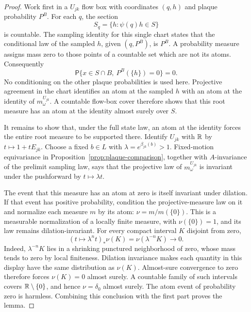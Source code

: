 \begin{proof}
Work first in a $U_{jk}$ flow box with coordinates $(q,h)$ and plaque
probability $P^B$.  For each $q$, the section
\[
                  S_q=\{h:\psi(q)h\in S\}
\]
is countable.  The sampling identity for this single chart states
that the conditional law of the sampled $h$, given $(q,P^B)$, is
$P^B$.  A probability measure assigns mass zero to those points of a
countable set which are not its atoms.  Consequently
\[
 \mathsf P\{x\in S\cap B,\ P^B(\{h\})=0\}=0.
\]
No conditioning on the other plaque probabilities is used here.
Projective agreement in the chart identifies an atom at the sampled
$h$ with an atom at the identity of $m^{U_{jk}}_\omega$.  A countable
flow-box cover therefore shows that this root measure has an atom at
the identity almost surely over $S$.

It remains to show that, under the full state law, an atom at the
identity forces the entire root measure to be supported there.
Identify $U_{jk}$ with $\mathbb R$ by $t\mapsto1+tE_{jk}$.  Choose a fixed
$b\in L$ with $\lambda=e^{\beta_{jk}(b)}>1$.  Fixed-motion equivariance
in Proposition~\ref{prop:plaque-comparison}, together with
$A$-invariance of the prelimit sampling law, says that the projective
law of $m^{U_{jk}}_\omega$ is invariant under the pushforward by
$t\mapsto\lambda t$.

The event that this measure has an atom at zero is itself invariant
under dilation.  If that event has positive probability, condition
the projective-measure law on it and normalize each measure $m$ by
its atom: $\nu=m/m(\{0\})$.  This is a measurable normalization of a
locally finite measure, with $\nu(\{0\})=1$, and its law remains
dilation-invariant.  For every compact interval $K$ disjoint from
zero,
\[
 (t\mapsto\lambda^n t)_*\nu(K)
         =\nu(\lambda^{-n}K)\longrightarrow0.
\]
Indeed, $\lambda^{-n}K$ lies in a shrinking punctured neighborhood of
zero, whose mass tends to zero by local finiteness.  Dilation
invariance makes each quantity in this display have the same
distribution as $\nu(K)$.  Almost-sure convergence to zero therefore
forces $\nu(K)=0$ almost surely.  A countable family of such intervals
covers $\mathbb R\setminus\{0\}$, and hence $\nu=\delta_0$ almost surely.
The atom event of probability zero is harmless.  Combining this
conclusion with the first part proves the lemma.
\end{proof}
